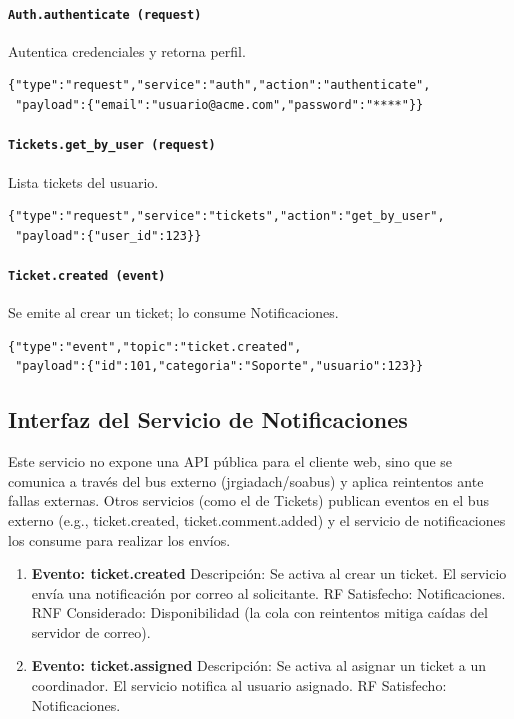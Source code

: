 \documentclass[letter,12pt]{article}
\begin{document}
\paragraph{\texttt{Auth.authenticate (request)}} Autentica credenciales y retorna perfil.
\begin{verbatim}
{"type":"request","service":"auth","action":"authenticate",
 "payload":{"email":"usuario@acme.com","password":"****"}}
\end{verbatim}

\paragraph{\texttt{Tickets.get\_by\_user (request)}} Lista tickets del usuario.
\begin{verbatim}
{"type":"request","service":"tickets","action":"get_by_user",
 "payload":{"user_id":123}}
\end{verbatim}

\paragraph{\texttt{Ticket.created (event)}} Se emite al crear un ticket; lo consume Notificaciones.
\begin{verbatim}
{"type":"event","topic":"ticket.created",
 "payload":{"id":101,"categoria":"Soporte","usuario":123}}
\end{verbatim}

\subsection{Interfaz del Servicio de Notificaciones}
    
    Este servicio no expone una API pública para el cliente web, sino que se comunica a través del bus externo (jrgiadach/soabus) y aplica reintentos ante fallas externas. Otros servicios (como el de Tickets) publican eventos en el bus externo (e.g., {ticket.created}, {ticket.comment.added}) y el servicio de notificaciones los consume para realizar los envíos.
   \begin{enumerate}
    \item \textbf{Evento: ticket.created}
          \newline Descripción: Se activa al crear un ticket. El servicio envía una notificación por correo al solicitante.
          \newline RF Satisfecho: Notificaciones.
          \newline RNF Considerado: Disponibilidad (la cola con reintentos mitiga caídas del servidor de correo).
          
    \item \textbf{Evento: ticket.assigned}
          \newline Descripción: Se activa al asignar un ticket a un coordinador. El servicio notifica al usuario asignado.
          \newline RF Satisfecho: Notificaciones.
          
\end{enumerate}
\end{document}
